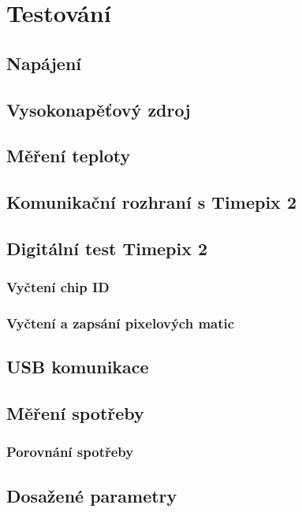 \chapter{Testování}
\section{Napájení}

\section{Vysokonapěťový zdroj}
 
\section{Měření teploty}
\section{Komunikační rozhraní s Timepix 2}		%

\section{Digitální test Timepix 2} %
	\subsection{Vyčtení chip ID}
	\subsection{Vyčtení a zapsání pixelových matic}
\section{USB komunikace}

\section{Měření spotřeby}
	\subsection{Porovnání spotřeby}
	\section{Dosažené parametry}